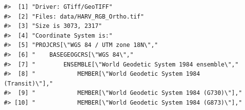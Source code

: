 \documentclass[
]{book}
\begin{document}
\begin{verbatim}
#>  [1] "Driver: GTiff/GeoTIFF"                                                                                                                                                                                                                                                          
#>  [2] "Files: data/HARV_RGB_Ortho.tif"                                                                                                                                                                                                                                                 
#>  [3] "Size is 3073, 2317"                                                                                                                                                                                                                                                             
#>  [4] "Coordinate System is:"                                                                                                                                                                                                                                                          
#>  [5] "PROJCRS[\"WGS 84 / UTM zone 18N\","                                                                                                                                                                                                                                             
#>  [6] "    BASEGEOGCRS[\"WGS 84\","                                                                                                                                                                                                                                                    
#>  [7] "        ENSEMBLE[\"World Geodetic System 1984 ensemble\","                                                                                                                                                                                                                      
#>  [8] "            MEMBER[\"World Geodetic System 1984 (Transit)\"],"                                                                                                                                                                                                                  
#>  [9] "            MEMBER[\"World Geodetic System 1984 (G730)\"],"                                                                                                                                                                                                                     
#> [10] "            MEMBER[\"World Geodetic System 1984 (G873)\"],"                                                                                                                                                                                                                     

\end{verbatim}
\end{document}
